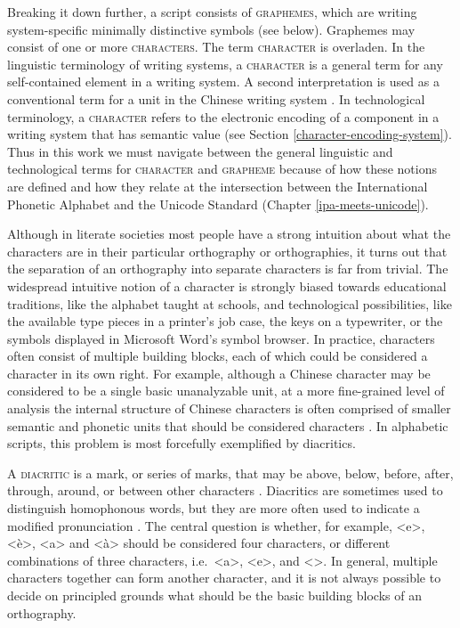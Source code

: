 Breaking it down further, a script consists of \textsc{graphemes}, which are writing 
system-specific minimally distinctive symbols (see below). Graphemes may consist of one or more 
\textsc{characters}. The term \textsc{character} is overladen. In the linguistic terminology of writing
systems, a \textsc{character} is a general term for any self-contained element
in a writing system. A second interpretation is used as a conventional term for a unit in the Chinese writing
system \citep{Daniels1996}. In technological terminology, a \textsc{character} 
refers to the electronic encoding of a component in a writing system that has semantic 
value (see Section \ref{character-encoding-system}). Thus in this work we must navigate 
between the general linguistic and technological terms for \textsc{character} 
and \textsc{grapheme} because of how these notions are defined and how they relate at the intersection 
between the International Phonetic Alphabet and the Unicode Standard (Chapter \ref{ipa-meets-unicode}).

Although in literate societies most people have a strong intuition
about what the characters are in their particular orthography or orthographies,
it turns out that the separation of an orthography into separate characters is
far from trivial. The widespread intuitive notion of a character is strongly
biased towards educational traditions, like the alphabet taught at schools, and
technological possibilities, like the available type pieces in a printer's job
case, the keys on a typewriter, or the symbols displayed in Microsoft Word's
symbol browser. In practice, characters often consist of multiple building
blocks, each of which could be considered a character in its own right. For
example, although a Chinese character may be considered to be a single basic
unanalyzable unit, at a more fine-grained level of analysis the internal
structure of Chinese characters is often comprised of smaller semantic and
phonetic units that should be considered characters \citep{Sproat2000}. In
alphabetic scripts, this problem is most forcefully exemplified by diacritics. 

A \textsc{diacritic} is a mark, or series of marks, that may be above, below, 
before, after, through, around, or between other characters \citep{Gaultney2002}. Diacritics are sometimes used to
distinguish homophonous words, but they are more often used to indicate a
modified pronunciation \citep[xli]{DanielsBright1996}. The central question is
whether, for example, <e>, <è>, <a> and <à> should be considered four
characters, or different combinations of three characters, i.e.\ <a>, <e>, and <>. 
In general, multiple characters together can form another character, and it is not always possible to
decide on principled grounds what should be the basic building blocks of an
orthography.

